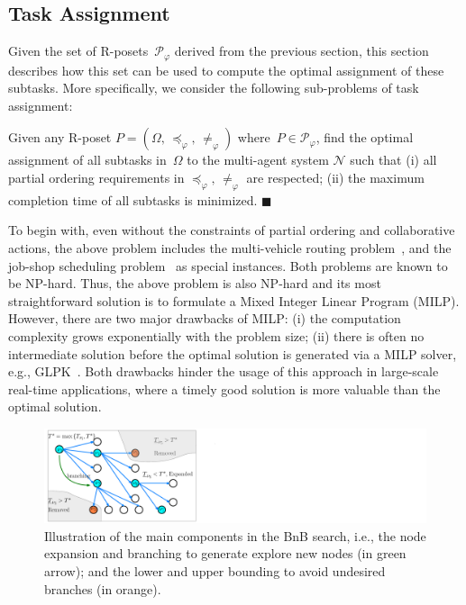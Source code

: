 \subsection{Task Assignment}\label{subsubsec:task-assignment}
Given the set of R-posets~$\mathcal{P}_{\varphi}$ derived from the previous
section, this section describes how this set can be used to compute
the optimal assignment of these subtasks. More specifically, we consider
the following sub-problems of task assignment:

\begin{problem}\label{problem:}
Given any R-poset $P=(\Omega,\, \preceq_{\varphi},\, \neq_{\varphi})$
where~$P\in \mathcal{P}_{\varphi}$,
find the optimal assignment of all subtasks in~$\Omega$ to the multi-agent system
$\mathcal{N}$ such that
(i) all partial ordering requirements in $\preceq_{\varphi},\, \neq_{\varphi}$ are
respected; (ii) the maximum completion time of all subtasks is minimized.
\hfill $\blacksquare$
\end{problem}



To begin with, even without the constraints of partial ordering
and collaborative actions, the above problem includes the multi-vehicle routing
problem~\citep{khamis2015multi},
and the job-shop scheduling problem~\citep{morrison2016branch} as special instances.
Both problems are known to be NP-hard.
Thus, the above problem is also NP-hard and its most straightforward solution
is to formulate a Mixed Integer Linear Program (MILP).
{However, there are two major drawbacks of MILP:
(i) the computation complexity grows exponentially with the problem size;
(ii) there is often no intermediate solution before the optimal solution is generated via a MILP solver,
  e.g., GLPK~\citep{makhorin2008glpk}.
Both drawbacks hinder the usage of this approach in large-scale real-time applications,
where a timely good solution is more valuable than the optimal solution.}

\begin{figure}[t!]
	\centering
	\includegraphics[width=0.9\linewidth]{figures/bnb_graph3.pdf}
	\caption{
		Illustration of the main components in the BnB search,
		i.e., the node expansion and branching to generate explore new nodes (in green arrow);
		and the lower and upper bounding to avoid undesired branches (in orange).}
	\label{fig:bnb_search_logic}
\end{figure}

